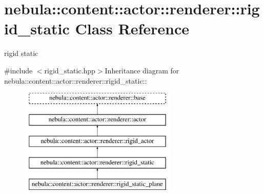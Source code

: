 \hypertarget{classnebula_1_1content_1_1actor_1_1renderer_1_1rigid__static}{
\section{nebula::content::actor::renderer::rigid\_\-static Class Reference}
\label{classnebula_1_1content_1_1actor_1_1renderer_1_1rigid__static}
}


rigid static  


{\ttfamily \#include $<$rigid\_\-static.hpp$>$}Inheritance diagram for nebula::content::actor::renderer::rigid\_\-static::\begin{figure}[H]
\begin{center}
\leavevmode
\includegraphics[height=5cm]{classnebula_1_1content_1_1actor_1_1renderer_1_1rigid__static}
\end{center}
\end{figure}
